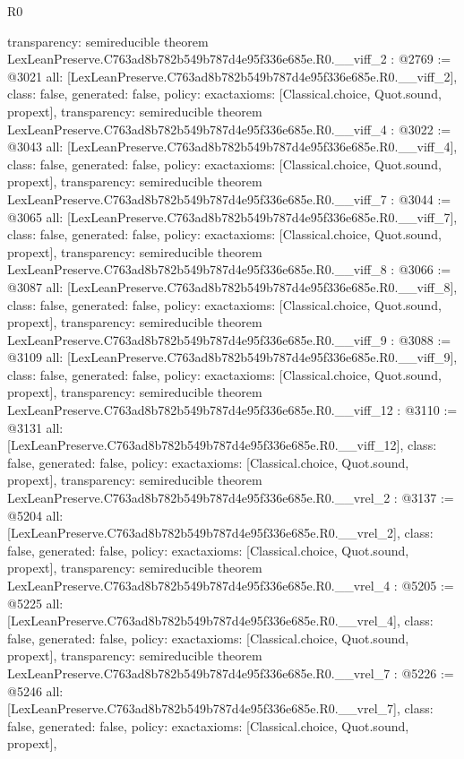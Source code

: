 \begin{lexlean}{R0}
\begin{coremodule}
{  transparency: semireducible
}
theorem LexLeanPreserve.C763ad8b782b549b787d4e95f336e685e.R0.__viff_2 : @2769 := @3021 {
  all: [LexLeanPreserve.C763ad8b782b549b787d4e95f336e685e.R0.__viff_2],
  class: false,
  generated: false,
  policy: exact{axioms: [Classical.choice, Quot.sound, propext]},
  transparency: semireducible
}
theorem LexLeanPreserve.C763ad8b782b549b787d4e95f336e685e.R0.__viff_4 : @3022 := @3043 {
  all: [LexLeanPreserve.C763ad8b782b549b787d4e95f336e685e.R0.__viff_4],
  class: false,
  generated: false,
  policy: exact{axioms: [Classical.choice, Quot.sound, propext]},
  transparency: semireducible
}
theorem LexLeanPreserve.C763ad8b782b549b787d4e95f336e685e.R0.__viff_7 : @3044 := @3065 {
  all: [LexLeanPreserve.C763ad8b782b549b787d4e95f336e685e.R0.__viff_7],
  class: false,
  generated: false,
  policy: exact{axioms: [Classical.choice, Quot.sound, propext]},
  transparency: semireducible
}
theorem LexLeanPreserve.C763ad8b782b549b787d4e95f336e685e.R0.__viff_8 : @3066 := @3087 {
  all: [LexLeanPreserve.C763ad8b782b549b787d4e95f336e685e.R0.__viff_8],
  class: false,
  generated: false,
  policy: exact{axioms: [Classical.choice, Quot.sound, propext]},
  transparency: semireducible
}
theorem LexLeanPreserve.C763ad8b782b549b787d4e95f336e685e.R0.__viff_9 : @3088 := @3109 {
  all: [LexLeanPreserve.C763ad8b782b549b787d4e95f336e685e.R0.__viff_9],
  class: false,
  generated: false,
  policy: exact{axioms: [Classical.choice, Quot.sound, propext]},
  transparency: semireducible
}
theorem LexLeanPreserve.C763ad8b782b549b787d4e95f336e685e.R0.__viff_12 : @3110 := @3131 {
  all: [LexLeanPreserve.C763ad8b782b549b787d4e95f336e685e.R0.__viff_12],
  class: false,
  generated: false,
  policy: exact{axioms: [Classical.choice, Quot.sound, propext]},
  transparency: semireducible
}
theorem LexLeanPreserve.C763ad8b782b549b787d4e95f336e685e.R0.__vrel_2 : @3137 := @5204 {
  all: [LexLeanPreserve.C763ad8b782b549b787d4e95f336e685e.R0.__vrel_2],
  class: false,
  generated: false,
  policy: exact{axioms: [Classical.choice, Quot.sound, propext]},
  transparency: semireducible
}
theorem LexLeanPreserve.C763ad8b782b549b787d4e95f336e685e.R0.__vrel_4 : @5205 := @5225 {
  all: [LexLeanPreserve.C763ad8b782b549b787d4e95f336e685e.R0.__vrel_4],
  class: false,
  generated: false,
  policy: exact{axioms: [Classical.choice, Quot.sound, propext]},
  transparency: semireducible
}
theorem LexLeanPreserve.C763ad8b782b549b787d4e95f336e685e.R0.__vrel_7 : @5226 := @5246 {
  all: [LexLeanPreserve.C763ad8b782b549b787d4e95f336e685e.R0.__vrel_7],
  class: false,
  generated: false,
  policy: exact{axioms: [Classical.choice, Quot.sound, propext]},
}
\end{coremodule}
\end{lexlean}
